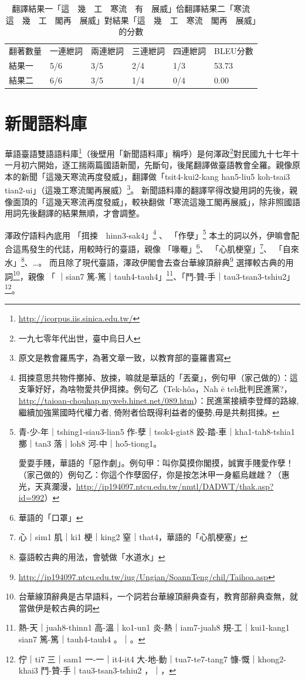\documentclass[final,oneside,onecolumn,12pt,a4paper]{book}%
\begin{document}
\begin{table}
\caption{翻譯結果一「這　幾　工　寒流　有　展威」佮翻譯結果二「寒流　這　幾　工　閣再　展威」對結果「這　幾　工　寒流　閣再　展威」的分數}%
\label{表：範例BLEU分數}
\begin{tabular}{llllll}
翻著數量 & 一連紲詞 & 兩連紲詞 & 三連紲詞 & 四連紲詞 & BLEU分數\\
結果一 & 5/6 & 3/5 & 2/4 & 1/3 & 53.73\\
結果二 & 6/6 & 3/5 & 1/4 & 0/4 & 0.00
\end{tabular}
\end{table}

\section{新聞語料庫}
\label{節：新聞語料庫}
華語臺語雙語語料庫\footnote{\url{http://icorpus.iis.sinica.edu.tw/}}（後壁用「新聞語料庫」稱呼）是何澤政\footnote{一九七零年代出世，臺中烏日人}對民國九十七年十一月初六開始，逐工揣兩篇國語新聞，先斷句，後尾翻譯做臺語教會全羅。親像原本的新聞「這幾天寒流再度發威」，翻譯做「tsit4-kui2-kang han5-liu5 koh-tsai3 tian2-ui」（這幾工寒流閣再展威）\footnote{原文是教會羅馬字，為著文章一致，以教育部的臺羅書寫}。
新聞語料庫的翻譯罕得改變用詞的先後，親像面頂的「這幾天寒流再度發威」，較袂翻做「寒流這幾工閣再展威」，除非照國語用詞先後翻譯的結果無順，才會調整。

澤政佇語料內底用
「挕捒　hinn3-sak4」\footnote{挕捒意思共物件擲掉、放捒，嘛就是華話的「丟棄」，例句甲（家己做的）：這支筆好好，為啥物愛共伊挕捒。例句乙（Tek-hôa，Nah ē teh批判民進黨?，\url{http://taioan-chouhap.myweb.hinet.net/089.htm}）：民進黨接續李登輝的路線, 繼續加強黨國時代權力者, 倚附者佮既得利益者的優勢,毋是共刜挕捒。}
、
「作孽」\footnote{
青-少-年｜tshing1-siau3-lian5 作-孽｜tsok4-giat8 跤-踏-車｜kha1-tah8-tshia1 擲｜tan3 落｜loh8 河-中｜ho5-tiong1。

愛耍手賤，華語的「惡作劇」。例句甲：叫你莫摸你閣摸，誠實手賤愛作孽！（家己做的）例句乙：你這个作孽囡仔，你是按怎沐甲一身軀烏趖趖？（惠光，天真瀾漫，\url{http://ip194097.ntcu.edu.tw/nmtl/DADWT/thak.asp?id=992}）}
本土的詞以外，伊嘛會配合這馬發生的代誌，用較時行的臺語，親像
「喙罨」\footnote{華語的「口罩」}、
「心肌梗窒」\footnote{心｜sim1 肌｜ki1 梗｜king2 窒｜that4，華語的「心肌梗塞」}、
「自來水」\footnote{臺語較古典的用法，會號做「水道水」}、…。
而且除了現代臺語，澤政伊閣會去查台華線頂辭典\footnote{\url{http://ip194097.ntcu.edu.tw/iug/Ungian/SoannTeng/chil/Taihoa.asp}}
選擇較古典的用詞\footnote{台華線頂辭典是古早語料，一个詞若台華線頂辭典查有，教育部辭典查無，就當做伊是較古典的詞}，親像
「𤺪｜sian7 篤-篤｜tauh4-tauh4」\footnote{熱-天｜juah8-thinn1 高-溫｜ko1-un1 炎-熱｜iam7-juah8 規-工｜kui1-kang1 𤺪｜sian7 篤-篤｜tauh4-tauh4 。｜。}、「鬥-贊-手｜tau3-tsan3-tshiu2」\footnote{佇｜ti7 三｜sam1 一-一｜it4-it4 大-地-動｜tua7-te7-tang7 慷-慨｜khong2-khai3 鬥-贊-手｜tau3-tsan3-tshiu2 ，｜，}。
\end{document}
